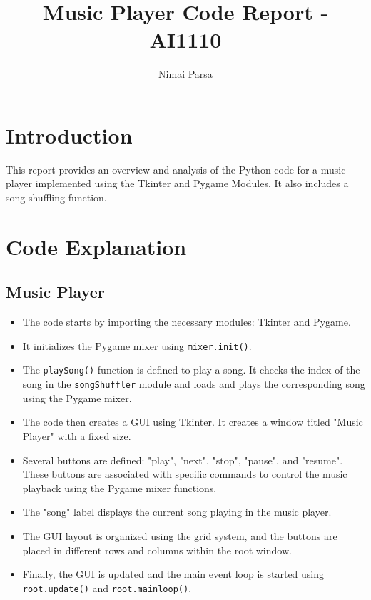 \documentclass[journal,12pt,twocolumn]{IEEEtran}
\begin{document}
\vspace{3cm}

\title{Music Player Code Report - AI1110}
\author{Nimai Parsa}

\maketitle

\section{Introduction}
This report provides an overview and analysis of the Python code for a music player implemented using the Tkinter and Pygame Modules. It also includes a song shuffling function.

\section{Code Explanation}
\subsection{Music Player}
\begin{itemize}
  \item The code starts by importing the necessary modules: Tkinter and Pygame.
  \item It initializes the Pygame mixer using \texttt{mixer.init()}.
  \item The \texttt{playSong()} function is defined to play a song. It checks the index of the song in the \texttt{songShuffler} module and loads and plays the corresponding song using the Pygame mixer.
  \item The code then creates a GUI using Tkinter. It creates a window titled "Music Player" with a fixed size.
  \item Several buttons are defined: "play", "next", "stop", "pause", and "resume". These buttons are associated with specific commands to control the music playback using the Pygame mixer functions.
  \item The "song" label displays the current song playing in the music player.
  \item The GUI layout is organized using the grid system, and the buttons are placed in different rows and columns within the root window.
  \item Finally, the GUI is updated and the main event loop is started using \texttt{root.update()} and \texttt{root.mainloop()}.
\end{itemize}
\end{document}
